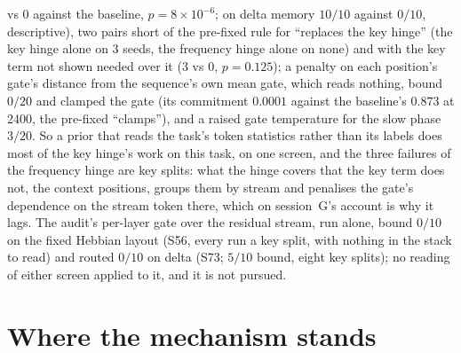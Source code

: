 \documentclass[11pt]{article}
\begin{document}
vs 0 against the baseline, $p = 8\times10^{-6}$; on delta memory $10/10$ against $0/10$, descriptive), two pairs short of the pre-fixed rule for ``replaces the key hinge'' (the key hinge alone on 3 seeds, the frequency hinge alone on none) and with the key term not shown needed over it (3 vs 0, $p = 0.125$); a penalty on each position's gate's distance from the sequence's own mean gate, which reads nothing, bound $0/20$ and clamped the gate (its commitment $0.0001$ against the baseline's $0.873$ at 2400, the pre-fixed ``clamps''), and a raised gate temperature for the slow phase $3/20$. So a prior that reads the task's token statistics rather than its labels does most of the key hinge's work on this task, on one screen, and the three failures of the frequency hinge are key splits: what the hinge covers that the key term does not, the context positions, groups them by stream and penalises the gate's dependence on the stream token there, which on session~G's account is why it lags. The audit's per-layer gate over the residual stream, run alone, bound $0/10$ on the fixed Hebbian layout (S56, every run a key split, with nothing in the stack to read) and routed $0/10$ on delta (S73; $5/10$ bound, eight key splits); no reading of either screen applied to it, and it is not pursued.

\section{Where the mechanism stands}
\label{sec:synthesis}
\end{document}

